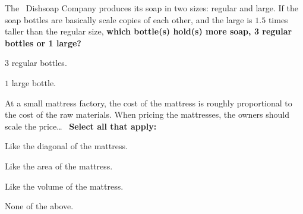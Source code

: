 \documentclass[noauthor,nooutcomes]{ximera}
\begin{document}
\begin{exercise}
  The \mooculus~Dishsoap Company produces its soap in two sizes:
  regular and large. If the soap bottles are basically scale copies of
  each other, and the large is $1.5$ times taller than the regular
  size, \textbf{which bottle(s) hold(s) more soap, 3 regular bottles or 1
    large?}
   \begin{enumerate}
   \begin{multicols}{2}
   \item $3$ regular bottles.
   \item $1$ large bottle.
   \end{multicols}
 \end{enumerate}
\end{exercise}





\begin{exercise}
  At a small mattress factory, the cost of the mattress is roughly
  proportional to the cost of the raw materials. When pricing the
  mattresses, the owners should scale the price\dots~
\textbf{Select all that apply:}
 \begin{enumerate}
   \begin{multicols}{2}
   \item Like the diagonal of the mattress.
   \item Like the area of the mattress.
   \item Like the volume of the mattress.
   \item None of the above.
   \end{multicols}
 \end{enumerate}
\end{exercise}




\end{document}
